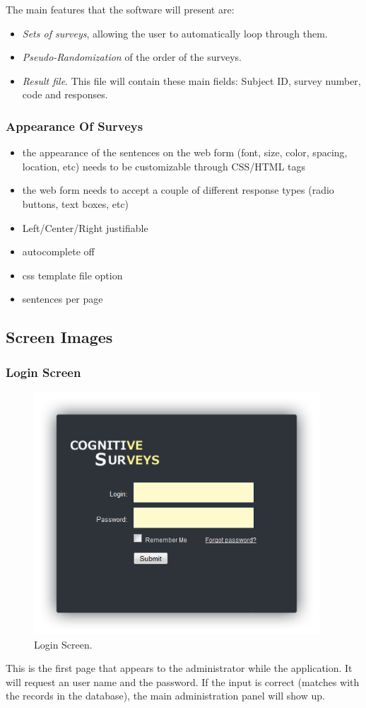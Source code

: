\documentclass[a4paper,12pt,oneside]{report}
\begin{document}
The main features that the software will present are:
\begin{itemize}
\item {\it Sets of surveys}, allowing the user to automatically loop through them.
\item {\it Pseudo-Randomization} of the order of the surveys.
\item {\it Result file}. This file will contain these main fields: Subject ID, survey number, code and responses.
\end{itemize}

\subsubsection { Appearance Of Surveys}
\begin{itemize} 
	\item  the appearance of the sentences on the web form (font, size, color, spacing, location, etc) needs to be customizable through CSS/HTML tags
	\item the web form needs to accept a couple of different response types (radio buttons, text boxes, etc)
	\item Left/Center/Right justifiable
	\item autocomplete off
	\item css template file option
	\item sentences per page
\end{itemize}

\subsection{ Screen Images }
\vskip 0.8cm
\subsubsection{Login Screen}
\begin{figure}[h!!]
  \begin{center}
   \includegraphics[width=10.7cm]{pics/login.png}
  \end{center}
\caption{Login Screen.}
\end{figure}
\vskip  1.4cm
This is the first page that appears to the administrator while the application. It will request an user name and the password. If the input is correct (matches with the records in the database), the main administration panel will show up.
\end{document}
